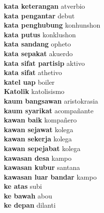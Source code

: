 \textbf{ kata keterangan  } atverbio \\
\textbf{ kata pengantar  } debut \\
\textbf{ kata penghubung  } konhunshon \\
\textbf{ kata putus  } konklushon \\
\textbf{ kata sandang  } opheto \\
\textbf{ kata sepakat  } akuerdo \\
\textbf{ kata sifat partisip  } aktivo \\
\textbf{ kata sifat  } athetivo \\
\textbf{ katel uap  } boiler \\
\textbf{ Katolik  } katolisismo \\
\textbf{ kaum bangsawan  } aristokrasia \\
\textbf{ kaum syarikat  } acompañante \\
\textbf{ kawan baik  } kompañero \\
\textbf{ kawan sejawat  } kolega \\
\textbf{ kawan sekerja  } kolega \\
\textbf{ kawan sepejabat  } kolega \\
\textbf{ kawasan desa  } kampo \\
\textbf{ kawasan kubur  } santana \\
\textbf{ kawasan luar bandar  } kampo \\
\textbf{ ke atas  } subi \\
\textbf{ ke bawah  } abou \\
\textbf{ ke depan  } dilanti \\
